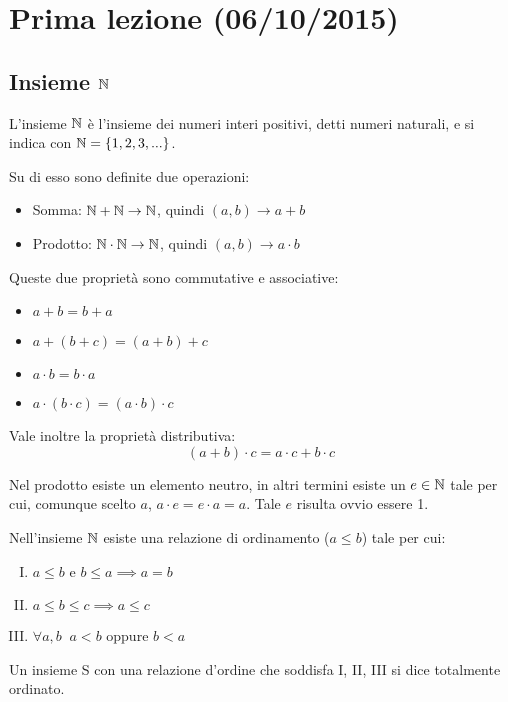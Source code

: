 \chapter{Prima lezione (06/10/2015)}

\section{Insieme $\mathbb N$}

\begin{definition}
L'insieme $\mathbb N$ è l'insieme dei numeri interi positivi, detti numeri naturali, e si indica con $\mathbb N=\{1,2,3,...\}$.
\end{definition}

Su di esso sono definite due operazioni:
\begin{itemize}
\item Somma: $\mathbb N + \mathbb N \to \mathbb N$, quindi $(a, b) \to a + b$
\item Prodotto: $\mathbb N \cdot \mathbb N \to \mathbb N$, quindi $(a, b) \to a\cdot b$
\end{itemize}

Queste due proprietà sono commutative e associative:
\begin{itemize}
\item $a+b=b+a$
\item $a+(b+c)=(a+b)+c$
\item $a\cdot b = b\cdot a$
\item $a\cdot(b\cdot c) = (a\cdot b)\cdot c$
\end{itemize}

Vale inoltre la proprietà distributiva:
\begin{equation*}
(a+b)\cdot c = a\cdot c + b\cdot c
\end{equation*}

Nel prodotto esiste un elemento neutro, in altri termini esiste un $e \in \mathbb N$ tale per cui, comunque scelto $a$, $a \cdot e = e \cdot a = a$. Tale $e$ risulta ovvio essere 1.

Nell'insieme $\mathbb N$ esiste una relazione di ordinamento ($a \le b$) tale per cui:
\begin{enumerate}[I.]
\item $a \le b$ e $b \le a \implies a = b$
\item $a \le b \le c \implies a \le c$
\item $\forall a,b \;\; a < b$ oppure $b < a$
\end{enumerate}


\begin{definition}
Un insieme S con una relazione d'ordine che soddisfa I, II, III si dice totalmente ordinato.
\end{definition}

